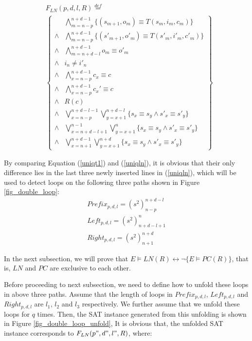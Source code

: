 \documentclass{sig-alternate}
\begin{document}
\begin{equation}\label{uniqln}
\begin{split}
&F_{LN}(p,d,l,R)\stackrel{def}{=}\\
&\left\{
\begin{array}{cc}
&\bigwedge_{m=n-p}^{n+d-1}
\{
(s_{m+1},o_m)\equiv T(s_m,i_m,c_m)
\}
\\
\wedge&\bigwedge_{m=n-p}^{n+d-1}
\{
(s'_{m+1},o'_m)\equiv T(s'_m,i'_m,c'_m)
\}
\\
\wedge&\bigwedge_{m=n+d-l}^{n+d-1}o_m\equiv o'_m \\
\wedge& i_n\ne i'_n \\
\wedge&\bigwedge_{x=n-p}^{n+d-1}c_x\equiv c \\
\wedge&\bigwedge_{x=n-p}^{n+d-1}c_x'\equiv c \\
\wedge& R(c) \\
\wedge& \bigvee_{x=n-p}^{n+d-l-1}\bigvee_{y=x+1}^{n+d-l} \{s_x\equiv s_y\wedge s'_x\equiv s'_y\} \\
\wedge& \bigvee_{x=n+d-l+1}^{n-1}\bigvee_{y=x+1}^{n} \{s_x\equiv s_y\wedge s'_x\equiv s'_y\} \\
\wedge& \bigvee_{x=n+1}^{n+d-1}\bigvee_{y=x+1}^{n+d} \{s_x\equiv s_y\wedge s'_x\equiv s'_y\}
\end{array}
\right\}
\end{split}
\end{equation}

By comparing Equation (\ref{uniqt1}) and (\ref{uniqln}),
it is obvious that their only difference lies in the last three newly inserted lines in (\ref{uniqln}),
which will be used to detect loops on the following three paths shown in Figure \ref{fig_double_loop}:
\begin{equation}
\begin{array}{c}
Prefix_{p,d,l}=(s^2)_{n-p}^{n+d-l} \\
Left_{p,d,l}=(s^2)_{n+d-l+1}^n \\
Right_{p,d,l}=(s^2)_{n+1}^{n+d}
\end{array}
\end{equation}

In the next subsection,
we will prove that $E\vDash LN(R)\leftrightarrow \neg \{E\vDash PC(R)\}$,
that is,
$LN$ and $PC$ are exclusive to each other.



Before proceeding to next subsection,
we need to define how to unfold these loops in above three paths.
Assume that the length of loops in $Prefix_{p,d,l}$, $Left_{p,d,l}$ and $Right_{p,d,l}$ are $l_1$, $l_2$ and $l_3$ respectively.
We further assume that we unfold these loops for $q$ times.
Then,
the SAT instance generated from this unfolding is shown in Figure \ref{fig_double_loop_unfold},
It is obvious that,
the unfolded SAT instance corresponds to $F_{LN}(p",d",l",R)$,
where:
\end{document}
